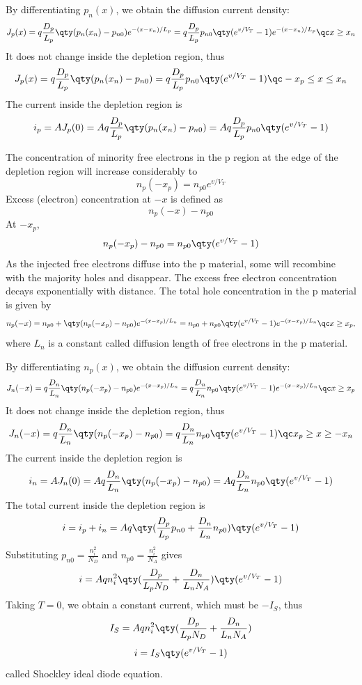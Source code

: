 \documentclass[a4paper,12pt]{report}
\begin{document}
By differentiating $p_n(x)$, we obtain the diffusion current density:
\[J_p(x)=q\frac{D_p}{L_p}\qty(p_n(x_n)-p_{n0})e^{-(x-x_n)/L_p}=q\frac{D_p}{L_p}p_{n0}\qty(e^{v/V_T}-1)e^{-(x-x_n)/L_p}\qc x\ge x_n\]
It does not change inside the depletion region, thus
\[J_p(x)=q\frac{D_p}{L_p}\qty(p_n(x_n)-p_{n0})=q\frac{D_p}{L_p}p_{n0}\qty(e^{v/V_T}-1)\qc -x_p\le x\le x_n\]
The current inside the depletion region is
\[i_p=AJ_p(0)=Aq\frac{D_p}{L_p}\qty(p_n(x_n)-p_{n0})=Aq\frac{D_p}{L_p}p_{n0}\qty(e^{v/V_T}-1)\]
\item The concentration of minority free electrons in the p region at the edge of the depletion region will increase considerably to
\[n_p(-x_p)=n_{p0}e^{v/V_T}\]
Excess (electron) concentration at $-x$ is defined as
\[n_p(-x)-n_{p0}\]
At $-x_p$,
\[n_p(-x_p)-n_{p0}=n_{p0}\qty(e^{v/V_T}-1)\]
As the injected free electrons diffuse into the p material, some will recombine with the majority holes and disappear. The excess free electron concentration decays exponentially with distance. The total hole concentration in the p material is given by
\[n_p(-x)=n_{p0}+\qty(n_p(-x_p)-n_{p0})e^{-(x-x_p)/L_n}=n_{p0}+n_{p0}\qty(e^{v/V_T}-1)e^{-(x-x_p)/L_n}\qc x\ge x_p,\]
where $L_n$ is a constant called diffusion length of free electrons in the p material.

By differentiating $n_p(x)$, we obtain the diffusion current density:
\[J_n(-x)=q\frac{D_n}{L_n}\qty(n_p(-x_p)-n_{p0})e^{-(x-x_p)/L_n}=q\frac{D_n}{L_n}n_{p0}\qty(e^{v/V_T}-1)e^{-(x-x_p)/L_n}\qc x\ge x_p\]
It does not change inside the depletion region, thus
\[J_n(-x)=q\frac{D_n}{L_n}\qty(n_p(-x_p)-n_{p0})=q\frac{D_n}{L_n}n_{p0}\qty(e^{v/V_T}-1)\qc x_p\ge x\ge -x_n\]
The current inside the depletion region is
\[i_n=AJ_n(0)=Aq\frac{D_n}{L_n}\qty(n_p(-x_p)-n_{p0})=Aq\frac{D_n}{L_n}n_{p0}\qty(e^{v/V_T}-1)\]
\eit
The total current inside the depletion region is
\[i=i_p+i_n=Aq\qty(\frac{D_p}{L_p}p_{n0}+\frac{D_n}{L_n}n_{p0})\qty(e^{v/V_T}-1)\]
Substituting $p_{n0}=\frac{n_i^2}{N_D}$ and $n_{p0}=\frac{n_i^2}{N_A}$ gives
\[i=Aqn_i^2\qty(\frac{D_p}{L_pN_D}+\frac{D_n}{L_nN_A})\qty(e^{v/V_T}-1)\]
Taking $T=0$, we obtain a constant current, which must be $-I_S$, thus
\[I_S=Aqn_i^2\qty(\frac{D_p}{L_pN_D}+\frac{D_n}{L_nN_A})\]
\[i=I_S\qty(e^{v/V_T}-1)\]
called Shockley ideal diode equation.
\end{document}
